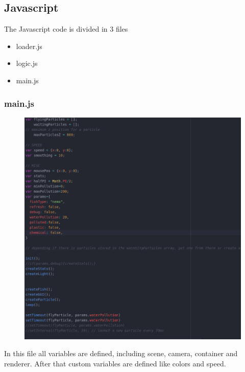 \documentclass[a4paper,10pt]{article}
\begin{document}
\subsection{Javascript}

The Javascript code is divided in 3 files
\begin{itemize}
 \item loader.js
 \item logic.js
 \item main.js
\end{itemize}

\subsubsection{main.js}
\begin{figure}[H]
  \includegraphics[width=\linewidth]{Screenshot_20190226_190629.png}
\end{figure}
In this file all variables are defined, including scene, camera, container and renderer. 
After that custom variables are defined like colors and speed.
\end{document}
